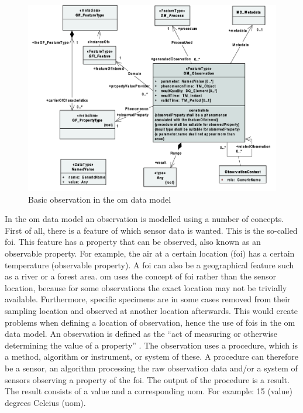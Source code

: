 \begin{figure}
	\centering
	\includegraphics[width=0.8\linewidth]{UML/OM_Observation.png}
	\caption{Basic observation in the \ac{om} data model \citep[p. 9]{SW:ISO}}
	\label{fig:OM_observation}
\end{figure}

In the \acf{om} data model an observation is modelled using a number of concepts. First of all, there is a feature of which sensor data is wanted. This is the so-called \acf{foi}. This feature has a property that can be observed, also known as an observable property. For example, the air at a certain location (\ac{foi}) has a certain temperature (observable property). A \ac{foi} can also be a geographical feature such as a river or a forest area. \ac{om} uses the concept of \ac{foi} rather than the sensor location, because for some observations the exact location may not be trivially available. Furthermore, specific specimens are in some cases removed from their sampling location and observed at another location afterwards. This would create problems when defining a location of observation, hence the use of \aclp{foi} in the \ac{om} data model. An observation is defined as the \enquote{act of measuring or otherwise determining the value of a property} \citep[p. 3]{SW:ISO}. The observation uses a procedure, which is a method, algorithm or instrument, or system of these. A procedure can therefore be a sensor, an algorithm processing the raw observation data and/or a system of sensors observing a property of the \ac{foi}. The output of the procedure is a result. The result consists of a value and a corresponding \acf{uom}. For example: 15 (value) degrees Celcius (\ac{uom}). 

